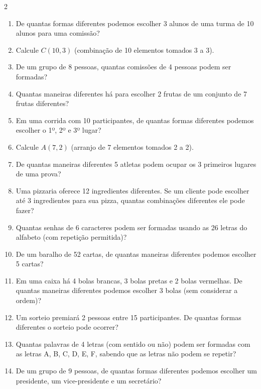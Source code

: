 \documentclass[11pt]{article}
\begin{document}
\begin{multicols}{2}
\begin{enumerate}[leftmargin=*]
\item De quantas formas diferentes podemos escolher 3 alunos de uma turma de 10 alunos para uma comissão?

\item Calcule $C(10,3)$ (combinação de 10 elementos tomados 3 a 3).

\item De um grupo de 8 pessoas, quantas comissões de 4 pessoas podem ser formadas?

\item Quantas maneiras diferentes há para escolher 2 frutas de um conjunto de 7 frutas diferentes?

\item Em uma corrida com 10 participantes, de quantas formas diferentes podemos escolher o 1º, 2º e 3º lugar?

\item Calcule $A(7,2)$ (arranjo de 7 elementos tomados 2 a 2).

\item De quantas maneiras diferentes 5 atletas podem ocupar os 3 primeiros lugares de uma prova?

\item Uma pizzaria oferece 12 ingredientes diferentes. Se um cliente pode escolher até 3 ingredientes para sua pizza, quantas combinações diferentes ele pode fazer?

\item Quantas senhas de 6 caracteres podem ser formadas usando as 26 letras do alfabeto (com repetição permitida)?

\item De um baralho de 52 cartas, de quantas maneiras diferentes podemos escolher 5 cartas?

\item Em uma caixa há 4 bolas brancas, 3 bolas pretas e 2 bolas vermelhas. De quantas maneiras diferentes podemos escolher 3 bolas (sem considerar a ordem)?

\item Um sorteio premiará 2 pessoas entre 15 participantes. De quantas formas diferentes o sorteio pode ocorrer?

\item Quantas palavras de 4 letras (com sentido ou não) podem ser formadas com as letras A, B, C, D, E, F, sabendo que as letras não podem se repetir?

\item De um grupo de 9 pessoas, de quantas formas diferentes podemos escolher um presidente, um vice-presidente e um secretário?


\end{enumerate}
\end{multicols}
\end{document}
